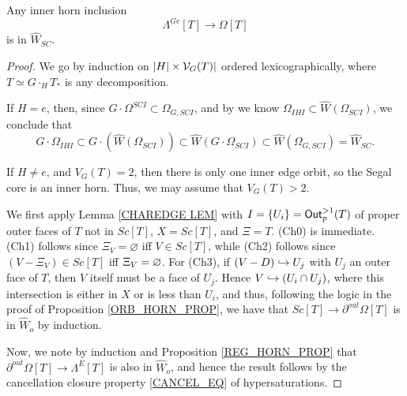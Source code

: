 \documentclass[a4paper,10pt,draft]{article}%
\begin{document}
\begin{proposition}
      \label{GHORN_IN_SC_PROP}
      Any inner horn inclusion
      \begin{equation}
            \Lambda^{G e}[T] \to \Omega[T]
      \end{equation}
      is in $\hat{W}_{SC}.$
\end{proposition}
\begin{proof}
      We go by induction on $|H| \times \mathcal V_G(T)|$ ordered lexicographically,
      where $T \simeq G \cdot_H T_*$ is any decomposition.
      
      If $H = e$, then, since $G \cdot \Omega^{SCI} \subset \Omega_{G,SCI}$,
      and by \cite[2.5]{CM13a} we know $\Omega_{IHI} \subset \hat{W}(\Omega_{SCI})$, we conclude that
      \begin{equation}
            G \cdot \Omega_{IHI}
            \subset G \cdot (\hat{W}(\Omega_{SCI}))
            \subset \hat{W}(G \cdot \Omega_{SCI})
            \subset \hat{W}(\Omega_{G, SCI}) = \hat{W}_{SC}.
      \end{equation}
      
      If $H \neq e$, and $V_G(T) = 2$, then there is only one inner edge orbit, so
      the Segal core is an inner horn.
      Thus, we may assume that $V_G(T) > 2$.

      We first apply Lemma \ref{CHAREDGE LEM} with
      $I = \left\{U_i\right\} = \mathsf{Out}^{>1}_p(T)$ of proper outer faces of $T$ not in $Sc[T]$,
      $X = Sc[T]$,
      and
      $\Xi = T$. 
      (Ch0) is immediate.
      (Ch1) follows since $\Xi_V = \varnothing$ iff $V \in Sc[T]$, while
      (Ch2) follows since $(V - \Xi_V) \in Sc[T]$ iff $\Xi_V = \varnothing$.
      For (Ch3), if $(V - D) \hookrightarrow U_j$ with $U_j$ an outer face of $T$,
      then $V$ itself must be a face of $U_j$.
      Hence $V \hookrightarrow (U_i \cap U_j)$, where this intersection is either in $X$ or is less than $U_i$,
      and thus, following the logic in the proof of Proposition \ref{ORB_HORN_PROP}, we have that
      $Sc[T] \to \partial^{out}\Omega[T]$
      is in $\hat{W}_o$ by induction.
      
      Now, we note by induction and Proposition \ref{REG_HORN_PROP} that
      $\partial^{out}\Omega[T] \to \Lambda^E[T]$
      is also in $\hat{W}_o$,
      and hence the result follows by the cancellation closure property \eqref{CANCEL_EQ} of hypersaturations.
\end{proof}
\end{document}

